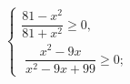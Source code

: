 \begin{ex}[type=ineq_system]
	\begin{condition}
		$\begin{cases} \dfrac{81 - x^2}{81 + x^2}\geqslant0  ,\\
			\;  \dfrac{x^2 - 9x}{x^2 - 9x + 99}\geqslant0 ;
		\end{cases}$
	\end{condition}
\end{ex}